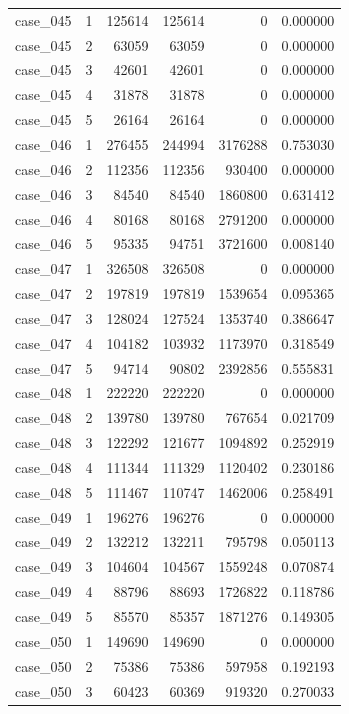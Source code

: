 \begin{longtable}{lrrrrr}
case\_045 & 1 & 125614 & 125614 & 0 & 0.000000 \\
case\_045 & 2 & 63059 & 63059 & 0 & 0.000000 \\
case\_045 & 3 & 42601 & 42601 & 0 & 0.000000 \\
case\_045 & 4 & 31878 & 31878 & 0 & 0.000000 \\
case\_045 & 5 & 26164 & 26164 & 0 & 0.000000 \\
case\_046 & 1 & 276455 & 244994 & 3176288 & 0.753030 \\
case\_046 & 2 & 112356 & 112356 & 930400 & 0.000000 \\
case\_046 & 3 & 84540 & 84540 & 1860800 & 0.631412 \\
case\_046 & 4 & 80168 & 80168 & 2791200 & 0.000000 \\
case\_046 & 5 & 95335 & 94751 & 3721600 & 0.008140 \\
case\_047 & 1 & 326508 & 326508 & 0 & 0.000000 \\
case\_047 & 2 & 197819 & 197819 & 1539654 & 0.095365 \\
case\_047 & 3 & 128024 & 127524 & 1353740 & 0.386647 \\
case\_047 & 4 & 104182 & 103932 & 1173970 & 0.318549 \\
case\_047 & 5 & 94714 & 90802 & 2392856 & 0.555831 \\
case\_048 & 1 & 222220 & 222220 & 0 & 0.000000 \\
case\_048 & 2 & 139780 & 139780 & 767654 & 0.021709 \\
case\_048 & 3 & 122292 & 121677 & 1094892 & 0.252919 \\
case\_048 & 4 & 111344 & 111329 & 1120402 & 0.230186 \\
case\_048 & 5 & 111467 & 110747 & 1462006 & 0.258491 \\
case\_049 & 1 & 196276 & 196276 & 0 & 0.000000 \\
case\_049 & 2 & 132212 & 132211 & 795798 & 0.050113 \\
case\_049 & 3 & 104604 & 104567 & 1559248 & 0.070874 \\
case\_049 & 4 & 88796 & 88693 & 1726822 & 0.118786 \\
case\_049 & 5 & 85570 & 85357 & 1871276 & 0.149305 \\
case\_050 & 1 & 149690 & 149690 & 0 & 0.000000 \\
case\_050 & 2 & 75386 & 75386 & 597958 & 0.192193 \\
case\_050 & 3 & 60423 & 60369 & 919320 & 0.270033 \\

\end{longtable}
